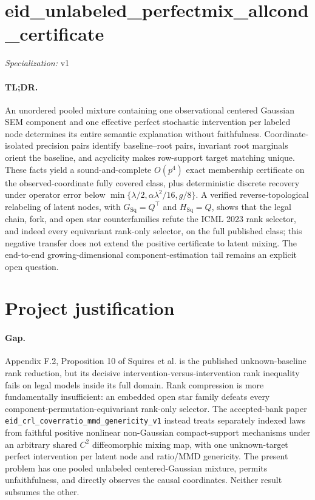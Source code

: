 \documentclass{article}
\begin{document}
\sloppy

\section*{eid\_\allowbreak{}unlabeled\_\allowbreak{}perfectmix\_\allowbreak{}allcond\_\allowbreak{}certificate}

\noindent\textit{Specialization:} v1\par

\paragraph{TL;DR.} An unordered pooled mixture containing one observational centered Gaussian SEM component and one effective perfect stochastic intervention per labeled node determines its entire semantic explanation without faithfulness. Coordinate-isolated precision pairs identify baseline--root pairs, invariant root marginals orient the baseline, and acyclicity makes row-support target matching unique. These facts yield a sound-and-complete \(O(p^4)\) exact membership certificate on the observed-coordinate fully covered class, plus deterministic discrete recovery under operator error below \(\min\{\lambda/2,\alpha\lambda^2/16,g/8\}\). A verified reverse-topological relabeling of latent nodes, with \(G_{\mathrm{Sq}}=Q^{\top}\) and \(H_{\mathrm{Sq}}=Q\), shows that the legal chain, fork, and open star counterfamilies refute the ICML 2023 rank selector, and indeed every equivariant rank-only selector, on the full published class; this negative transfer does not extend the positive certificate to latent mixing. The end-to-end growing-dimensional component-estimation tail remains an explicit open question.

\section{Project justification}

\paragraph{Gap.} Appendix F.2, Proposition 10 of Squires et al. is the published unknown-baseline rank reduction, but its decisive intervention-versus-intervention rank inequality fails on legal models inside its full domain. Rank compression is more fundamentally insufficient: an embedded open star family defeats every component-permutation-equivariant rank-only selector. The accepted-bank paper \texttt{eid\_crl\_coverratio\_mmd\_genericity\_v1} instead treats separately indexed laws from faithful positive nonlinear non-Gaussian compact-support mechanisms under an arbitrary shared \(C^2\) diffeomorphic mixing map, with one unknown-target perfect intervention per latent node and ratio/MMD genericity. The present problem has one pooled unlabeled centered-Gaussian mixture, permits unfaithfulness, and directly observes the causal coordinates. Neither result subsumes the other.
\end{document}
